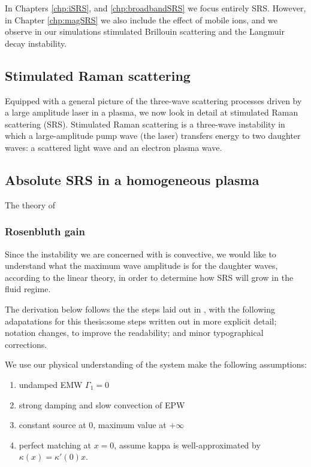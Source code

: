 In Chapters \ref{chp:iSRS}, and \ref{chp:broadbandSRS} we focus entirely \acrshort{SRS}. However, in Chapter \ref{chp:magSRS} we also include the effect of mobile ions, and we observe in our simulations stimulated Brillouin scattering and the Langmuir decay instability.




\subsection{Stimulated Raman scattering}

Equipped with a general picture of the three-wave scattering processes driven by a large amplitude laser in a plasma, we now look in detail at stimulated Raman scattering (\acrshort{SRS}). Stimulated Raman scattering is a three-wave instability in which a large-amplitude pump wave (the laser) transfers energy to two daughter waves: a scattered light wave and an electron plasma wave.

\subsection{Absolute SRS in a homogeneous plasma}
The theory of \citet{Nishikawa1976}  

\subsubsection{Rosenbluth gain}

Since the instability we are concerned with is convective, we would like to understand what the maximum wave amplitude is for the daughter waves, according to the linear theory, in order to determine how SRS will grow in the fluid regime.

The derivation below follows the the steps laid out in \citet{Nishikawa1976}, with the following adapatations for this thesis:some steps written out in more explicit detail; notation changes, to improve the readability; and minor typographical corrections. 

We use our physical understanding of the system make the following assumptions:
\begin{enumerate}
	\item undamped EMW $\Gamma_1 = 0$
	\item strong damping and slow convection of EPW
	\item constant source at 0, maximum value at $+\infty$
	\item perfect matching at $x=0$, assume kappa is well-approximated by 
	$\kappa(x) = \kappa'(0)x$.
\end{enumerate}

